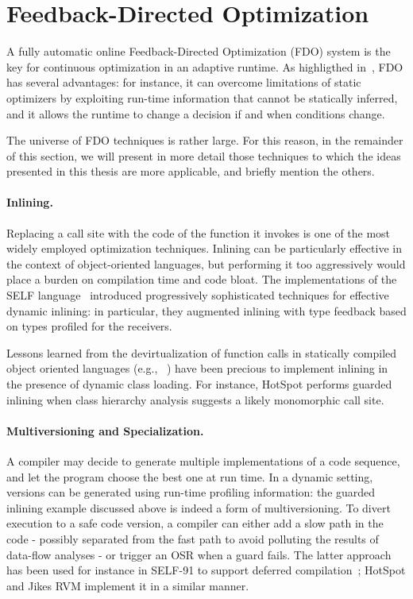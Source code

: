 \section{Feedback-Directed Optimization}
A fully automatic online Feedback-Directed Optimization (FDO) system is the key for continuous optimization in an adaptive runtime. As highligthed in~\cite{Arnold05}, FDO has several advantages: for instance, it can overcome limitations of static optimizers by exploiting run-time information that cannot be statically inferred, and it allows the runtime to change a decision if and when conditions change.

\noindent The universe of FDO techniques is rather large. For this reason, in the remainder of this section, we will present in more detail those techniques to which the ideas presented in this thesis are more applicable, and briefly mention the others.

\paragraph*{Inlining.} Replacing a call site with the code of the function it invokes is one of the most widely employed optimization techniques. Inlining can be particularly effective in the context of object-oriented languages, but performing it too aggressively would place a burden on compilation time and code bloat. The implementations of the SELF language~\cite{Holzle92,Holzle96} introduced progressively sophisticated techniques for effective dynamic inlining: in particular, they augmented inlining with type feedback based on types profiled for the receivers.

Lessons learned from the devirtualization of function calls in statically compiled object oriented languages (e.g., ~\cite{Bacon96,Dean96}) have been precious to implement inlining in the presence of dynamic class loading. For instance, HotSpot performs guarded inlining when class hierarchy analysis suggests a likely monomorphic call site.

\paragraph*{Multiversioning and Specialization.} A compiler may decide to generate multiple implementations of a code sequence, and let the program choose the best one at run time. In a dynamic setting, versions can be generated using run-time profiling information: the guarded inlining example discussed above is indeed a form of multiversioning. To divert execution to a safe code version, a compiler can either add a slow path in the code - possibly separated from the fast path to avoid polluting the results of data-flow analyses - or trigger an OSR when a guard fails. The latter approach has been used for instance in SELF-91 to support deferred compilation~\cite{Chambers91}; HotSpot and Jikes RVM implement it in a similar manner.

